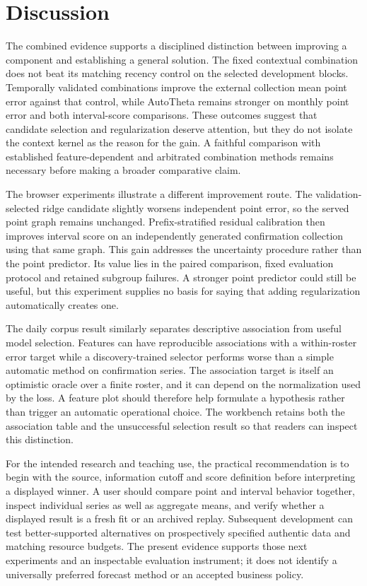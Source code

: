 \section{Discussion}
The combined evidence supports a disciplined distinction between improving a component and establishing a general solution. The fixed contextual combination does not beat its matching recency control on the selected development blocks. Temporally validated combinations improve the external collection mean point error against that control, while AutoTheta remains stronger on monthly point error and both interval-score comparisons. These outcomes suggest that candidate selection and regularization deserve attention, but they do not isolate the context kernel as the reason for the gain. A faithful comparison with established feature-dependent and arbitrated combination methods remains necessary before making a broader comparative claim.

The browser experiments illustrate a different improvement route. The validation-selected ridge candidate slightly worsens independent point error, so the served point graph remains unchanged. Prefix-stratified residual calibration then improves interval score on an independently generated confirmation collection using that same graph. This gain addresses the uncertainty procedure rather than the point predictor. Its value lies in the paired comparison, fixed evaluation protocol and retained subgroup failures. A stronger point predictor could still be useful, but this experiment supplies no basis for saying that adding regularization automatically creates one.

The daily corpus result similarly separates descriptive association from useful model selection. Features can have reproducible associations with a within-roster error target while a discovery-trained selector performs worse than a simple automatic method on confirmation series. The association target is itself an optimistic oracle over a finite roster, and it can depend on the normalization used by the loss. A feature plot should therefore help formulate a hypothesis rather than trigger an automatic operational choice. The workbench retains both the association table and the unsuccessful selection result so that readers can inspect this distinction.

For the intended research and teaching use, the practical recommendation is to begin with the source, information cutoff and score definition before interpreting a displayed winner. A user should compare point and interval behavior together, inspect individual series as well as aggregate means, and verify whether a displayed result is a fresh fit or an archived replay. Subsequent development can test better-supported alternatives on prospectively specified authentic data and matching resource budgets. The present evidence supports those next experiments and an inspectable evaluation instrument; it does not identify a universally preferred forecast method or an accepted business policy.

